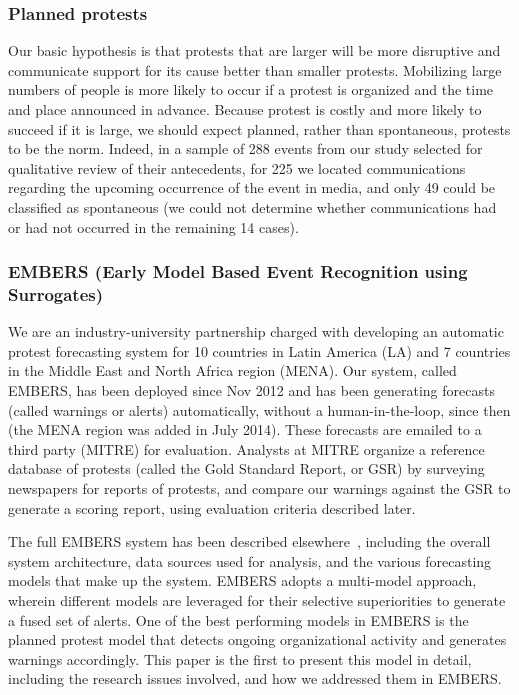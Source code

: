 \subsubsection{Planned protests}
Our basic hypothesis is that protests that are larger will be more
disruptive and communicate support for its cause better than smaller
protests.  Mobilizing large numbers of people is more likely to occur if
a protest is organized and the time and place announced in advance.
Because protest is costly and more likely to succeed if it is large, we
should expect planned, rather than spontaneous, protests to be the norm.
Indeed, in a sample of 288 events from our study selected for
qualitative review of their antecedents, for 225 we located
communications regarding the upcoming occurrence of the event in media,
and only 49 could be classified as spontaneous (we could not determine
whether communications had or had not occurred in the remaining 14
cases).

\subsubsection{EMBERS (Early Model Based Event Recognition using
Surrogates)}
We are an industry-university partnership charged with developing an
automatic protest forecasting system for 10 countries in
Latin America (LA) and 7 countries in the Middle East and North
Africa region (MENA). Our system, called EMBERS, has been
deployed since Nov 2012 and has been generating forecasts (called
warnings or alerts) automatically, without a human-in-the-loop, since then (the MENA region was added in July 2014). These forecasts are emailed to
a third party (MITRE) for evaluation. Analysts at MITRE organize a reference
database of protests (called the Gold Standard Report,
or GSR) by surveying newspapers for reports of protests, and
compare our warnings against the GSR to generate a scoring report, using evaluation
criteria described later.

The full EMBERS system has been described elsewhere~\cite{emberskdd,DBLP:conf/bigdataconf/DoyleKSAZLMZLBKFR14}, including
the overall system architecture, data sources used for analysis, and the
various forecasting models that make up the system. EMBERS adopts a multi-model approach,
wherein different models are leveraged for their selective superiorities
to generate a fused set of alerts. One of the
best performing models in EMBERS is the planned protest model that detects
ongoing organizational activity and generates warnings accordingly. This paper
is the first to present this model in detail, including the 
research issues involved, and how we addressed them in EMBERS.

